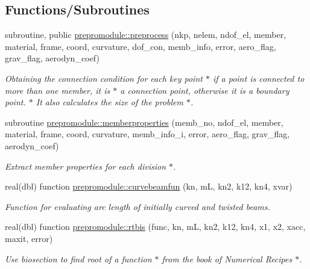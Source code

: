 \subsection*{Functions/\+Subroutines}
\begin{DoxyCompactItemize}
\item 
subroutine, public \hyperlink{namespaceprepromodule_a4c7a91f217e227051ae54c12a67e702e}{prepromodule\+::preprocess} (nkp, nelem, ndof\+\_\+el, member, material, frame, coord, curvature, dof\+\_\+con, memb\+\_\+info, error, aero\+\_\+flag, grav\+\_\+flag, aerodyn\+\_\+coef)
\begin{DoxyCompactList}\small\item\em Obtaining the connection condition for each key point $\ast$ if a point is connected to more than one member, it is $\ast$ a connection point, otherwise it is a boundary point. $\ast$ It also calculates the size of the problem $\ast$. \end{DoxyCompactList}\item 
subroutine \hyperlink{namespaceprepromodule_a2011e4ceff94f407d454a10cc186d45b}{prepromodule\+::memberproperties} (memb\+\_\+no, ndof\+\_\+el, member, material, frame, coord, curvature, memb\+\_\+info\+\_\+i, error, aero\+\_\+flag, grav\+\_\+flag, aerodyn\+\_\+coef)
\begin{DoxyCompactList}\small\item\em Extract member properties for each division $\ast$. \end{DoxyCompactList}\item 
real(dbl) function \hyperlink{namespaceprepromodule_aba8b0787c8f7aa138ead8a8c9161bc4b}{prepromodule\+::curvebeamfun} (kn, mL, kn2, k12, kn4, xvar)
\begin{DoxyCompactList}\small\item\em Function for evaluating arc length of initially curved and twisted beams. \end{DoxyCompactList}\item 
real(dbl) function \hyperlink{namespaceprepromodule_a078487e47a4a49a0b7f7c94be9f2c8f9}{prepromodule\+::rtbis} (func, kn, mL, kn2, k12, kn4, x1, x2, xacc, maxit, error)
\begin{DoxyCompactList}\small\item\em Use biosection to find root of a function $\ast$ from the book of Numerical Recipes $\ast$. \end{DoxyCompactList}\end{DoxyCompactItemize}
